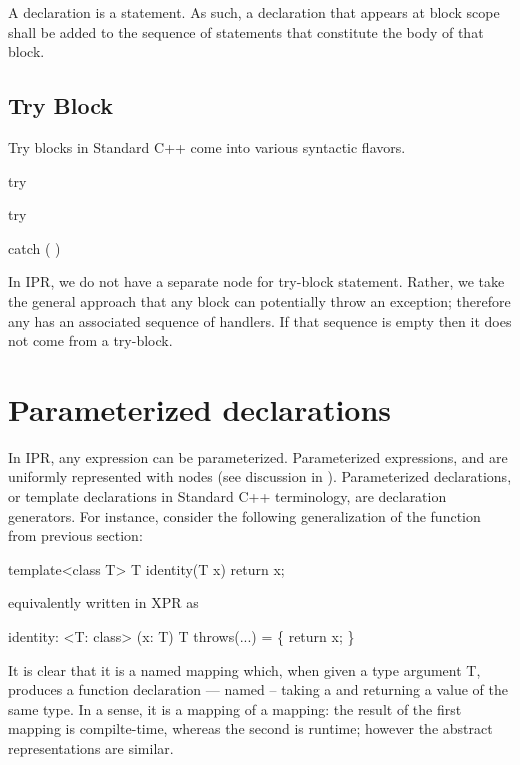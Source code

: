 \documentclass[11pt]{article}
\begin{document}
A declaration is a statement.  As such, a declaration that appears at block
scope shall be added to the sequence of statements that constitute the body of
that block.  

\subsection{Try Block}
\label{sec:stmt.try-block}
Try blocks in Standard C++ come into various syntactic flavors.
\begin{Grammar}
     try  

     try   

      

     catch (  ) 
\end{Grammar}

In IPR, we do not have a separate node for try-block statement.  Rather, we
take the general approach that any block can potentially throw an exception;
therefore any  has an associated sequence of handlers.
If that sequence is empty then it does not come from a try-block.  


\section{Parameterized declarations}
\label{sec:decls:parameterized}

In IPR, any expression can be parameterized.  Parameterized expressions, and
are uniformly represented with  nodes (see discussion
in ).  Parameterized declarations, or template
declarations in Standard C++ terminology, are declaration generators. 
For instance, consider the following generalization of the function
 from previous section:
\begin{Program}
  template<class T>
    T identity(T x) 
    { return x; }
\end{Program}
equivalently written in XPR as
\begin{Program}
  identity: <T: class> (x: T) T throws(...) = \{
     return x;
  \}
\end{Program}
It is clear that it is a named mapping which, when given a type argument
T, produces a function declaration --- named  -- taking a
 and returning a value of the same type.  In a sense, it is a mapping
of a mapping: the result of the first mapping is compilte-time, whereas the
second is runtime; however the abstract representations are similar.
\end{document}

